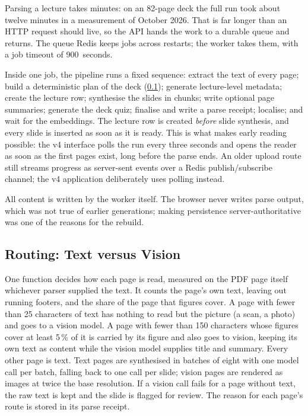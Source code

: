 Parsing a lecture takes minutes: on an 82-page deck the full run took about
twelve minutes in a measurement of October 2026. That is far longer than an HTTP
request should live, so the API hands the work to a durable queue and returns.
The queue Redis keeps jobs across restarts; the worker takes them, with a job
timeout of 900~seconds.

Inside one job, the pipeline runs a fixed sequence: extract the text of every
page; build a deterministic plan of the deck (\cref{sec:routing}); generate
lecture-level metadata; create the lecture row; synthesise the slides in
chunks; write optional page summaries; generate the deck quiz; finalise and
write a parse receipt; localise; and wait for the embeddings. The lecture row is
created \emph{before} slide synthesis, and every slide is inserted as soon as it
is ready. This is what makes early reading possible: the v4 interface polls the
run every three seconds and opens the reader as soon as the first pages exist,
long before the parse ends. An older upload route still streams progress as
server-sent events over a Redis publish/subscribe channel; the v4 application
deliberately uses polling instead.

All content is written by the worker itself. The browser never writes parse
output, which was not true of earlier generations; making persistence
server-authoritative was one of the reasons for the rebuild.

\subsection{Routing: Text versus Vision}
\label{sec:routing}

One function decides how each page is read, measured on the PDF page itself
whichever parser supplied the text. It counts the page's own text, leaving out
running footers, and the share of the page that figures cover. A page with fewer
than 25 characters of text has nothing to read but the picture (a scan, a photo)
and goes to a vision model. A page with fewer than 150 characters whose figures
cover at least 5\,\% of it is carried by its figure and also goes to vision,
keeping its own text as content while the vision model supplies title and
summary. Every other page is text. Text pages are synthesised in batches of
eight with one model call per batch, falling back to one call per slide; vision
pages are rendered as images at twice the base resolution. If a vision call fails
for a page without text, the raw text is kept and the slide is flagged for
review. The reason for each page's route is stored in its parse receipt.

